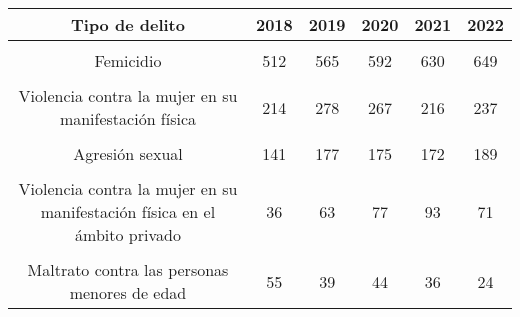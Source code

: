 \begin{tabular}[t]{cccccc}
\toprule
\textbf{Tipo de delito} & \textbf{2018} & \textbf{2019} & \textbf{2020} & \textbf{2021} & \textbf{2022}\\
\midrule
\cellcolor[HTML]{B6B3FF}{Violencia contra la mujer} & \cellcolor[HTML]{B6B3FF}{656} & \cellcolor[HTML]{B6B3FF}{663} & \cellcolor[HTML]{B6B3FF}{640} & \cellcolor[HTML]{B6B3FF}{570} & \cellcolor[HTML]{B6B3FF}{490}\\
Femicidio & 512 & 565 & 592 & 630 & 649\\
\cellcolor[HTML]{B6B3FF}{Violencia contra la mujer en su modalidad física y psicológica} & \cellcolor[HTML]{B6B3FF}{328} & \cellcolor[HTML]{B6B3FF}{356} & \cellcolor[HTML]{B6B3FF}{379} & \cellcolor[HTML]{B6B3FF}{368} & \cellcolor[HTML]{B6B3FF}{374}\\
Violencia contra la mujer en su manifestación física & 214 & 278 & 267 & 216 & 237\\
\cellcolor[HTML]{B6B3FF}{Agresión sexual con agravación de la pena} & \cellcolor[HTML]{B6B3FF}{223} & \cellcolor[HTML]{B6B3FF}{237} & \cellcolor[HTML]{B6B3FF}{238} & \cellcolor[HTML]{B6B3FF}{234} & \cellcolor[HTML]{B6B3FF}{260}\\
Agresión sexual & 141 & 177 & 175 & 172 & 189\\
\cellcolor[HTML]{B6B3FF}{Femicidio en grado de tentativa} & \cellcolor[HTML]{B6B3FF}{139} & \cellcolor[HTML]{B6B3FF}{147} & \cellcolor[HTML]{B6B3FF}{166} & \cellcolor[HTML]{B6B3FF}{189} & \cellcolor[HTML]{B6B3FF}{190}\\
Violencia contra la mujer en su manifestación física en el ámbito privado & 36 & 63 & 77 & 93 & 71\\
\cellcolor[HTML]{B6B3FF}{Violencia contra la mujer en su manifestación psicológica} & \cellcolor[HTML]{B6B3FF}{26} & \cellcolor[HTML]{B6B3FF}{29} & \cellcolor[HTML]{B6B3FF}{44} & \cellcolor[HTML]{B6B3FF}{47} & \cellcolor[HTML]{B6B3FF}{52}\\
Maltrato contra las personas menores de edad & 55 & 39 & 44 & 36 & 24\\
\bottomrule
\end{tabular}

